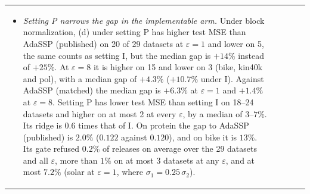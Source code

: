 \begin{tabular}{@{}lllll@{}}
\begin{itemize}[noitemsep]
  \item \emph{Setting P narrows the gap in the implementable arm.} Under block normalization, (d) under setting P has higher test MSE than AdaSSP (published) on 20 of 29 datasets at $\varepsilon = 1$ and lower on 5, the same counts as setting I, but the median gap is $+14\%$ instead of $+25\%$. At $\varepsilon = 8$ it is higher on 15 and lower on 3 (bike, kin40k and pol), with a median gap of $+4.3\%$ ($+10.7\%$ under I). Against AdaSSP (matched) the median gap is $+6.3\%$ at $\varepsilon = 1$ and $+1.4\%$ at $\varepsilon = 8$. Setting P has lower test MSE than setting I on 18--24 datasets and higher on at most 2 at every $\varepsilon$, by a median of $3$--$7\%$. Its ridge is $0.6$ times that of I. On protein the gap to AdaSSP (published) is $2.0\%$ ($0.122$ against $0.120$), and on bike it is $13\%$. Its gate refused $0.2\%$ of releases on average over the 29 datasets and all $\varepsilon$, more than $1\%$ on at most 3 datasets at any $\varepsilon$, and at most $7.2\%$ (solar at $\varepsilon = 1$, where $\sigma_1 = 0.25\,\sigma_2$).

\end{itemize}
\end{tabular}
